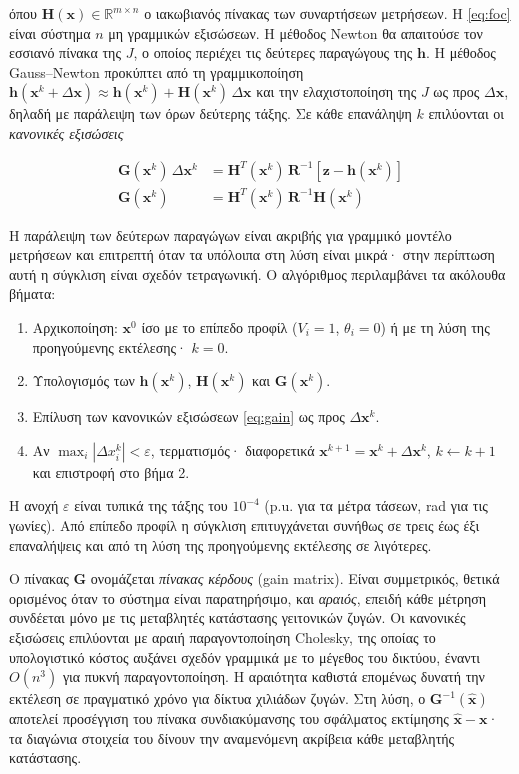 όπου $\mathbf{H}(\mathbf{x}) \in \mathbb{R}^{m \times n}$ ο ιακωβιανός πίνακας των συναρτήσεων
μετρήσεων. Η \eqref{eq:foc} είναι σύστημα $n$ μη γραμμικών εξισώσεων. Η μέθοδος Newton θα
απαιτούσε τον εσσιανό πίνακα της $J$, ο οποίος περιέχει τις δεύτερες παραγώγους της
$\mathbf{h}$. Η μέθοδος Gauss--Newton προκύπτει από τη γραμμικοποίηση
$\mathbf{h}(\mathbf{x}^{k} + \Delta\mathbf{x}) \approx \mathbf{h}(\mathbf{x}^{k}) +
\mathbf{H}(\mathbf{x}^{k})\,\Delta\mathbf{x}$ και την ελαχιστοποίηση της $J$ ως προς
$\Delta\mathbf{x}$, δηλαδή με παράλειψη των όρων δεύτερης τάξης. Σε κάθε επανάληψη $k$
επιλύονται οι \emph{κανονικές εξισώσεις}

\begin{align}
\mathbf{G}(\mathbf{x}^{k}) \, \Delta \mathbf{x}^{k}
  &= \mathbf{H}^{T}(\mathbf{x}^{k}) \, \mathbf{R}^{-1}
     \left[\mathbf{z} - \mathbf{h}(\mathbf{x}^{k})\right] \\
\mathbf{G}(\mathbf{x}^{k})
  &= \mathbf{H}^{T}(\mathbf{x}^{k}) \, \mathbf{R}^{-1} \mathbf{H}(\mathbf{x}^{k})
\label{eq:gain}
\end{align}

Η παράλειψη των δεύτερων παραγώγων είναι ακριβής για γραμμικό μοντέλο μετρήσεων και
επιτρεπτή όταν τα υπόλοιπα στη λύση είναι μικρά· στην περίπτωση αυτή η σύγκλιση είναι σχεδόν
τετραγωνική. Ο αλγόριθμος περιλαμβάνει τα ακόλουθα βήματα:

\begin{enumerate}
\item Αρχικοποίηση: $\mathbf{x}^{0}$ ίσο με το επίπεδο προφίλ ($V_i = 1$, $\theta_i = 0$) ή
      με τη λύση της προηγούμενης εκτέλεσης· $k = 0$.
\item Υπολογισμός των $\mathbf{h}(\mathbf{x}^{k})$, $\mathbf{H}(\mathbf{x}^{k})$ και
      $\mathbf{G}(\mathbf{x}^{k})$.
\item Επίλυση των κανονικών εξισώσεων \eqref{eq:gain} ως προς $\Delta\mathbf{x}^{k}$.
\item Αν $\max_i |\Delta x_i^{k}| < \varepsilon$, τερματισμός· διαφορετικά
      $\mathbf{x}^{k+1} = \mathbf{x}^{k} + \Delta\mathbf{x}^{k}$, $k \leftarrow k + 1$ και
      επιστροφή στο βήμα 2.
\end{enumerate}

Η ανοχή $\varepsilon$ είναι τυπικά της τάξης του $10^{-4}$ (p.u. για τα μέτρα τάσεων, rad για
τις γωνίες). Από επίπεδο προφίλ η σύγκλιση επιτυγχάνεται συνήθως σε τρεις έως έξι επαναλήψεις
και από τη λύση της προηγούμενης εκτέλεσης σε λιγότερες.

Ο πίνακας $\mathbf{G}$ ονομάζεται \emph{πίνακας κέρδους} (gain matrix). Είναι συμμετρικός,
θετικά ορισμένος όταν το σύστημα είναι παρατηρήσιμο, και \emph{αραιός}, επειδή κάθε μέτρηση
συνδέεται μόνο με τις μεταβλητές κατάστασης γειτονικών ζυγών. Οι κανονικές εξισώσεις
επιλύονται με αραιή παραγοντοποίηση Cholesky, της οποίας το υπολογιστικό κόστος αυξάνει
σχεδόν γραμμικά με το μέγεθος του δικτύου, έναντι $O(n^3)$ για πυκνή παραγοντοποίηση. Η
αραιότητα καθιστά επομένως δυνατή την εκτέλεση σε πραγματικό χρόνο για δίκτυα χιλιάδων
ζυγών. Στη λύση, ο $\mathbf{G}^{-1}(\hat{\mathbf{x}})$ αποτελεί προσέγγιση του πίνακα
συνδιακύμανσης του σφάλματος εκτίμησης $\hat{\mathbf{x}} - \mathbf{x}$· τα διαγώνια στοιχεία
του δίνουν την αναμενόμενη ακρίβεια κάθε μεταβλητής κατάστασης.

